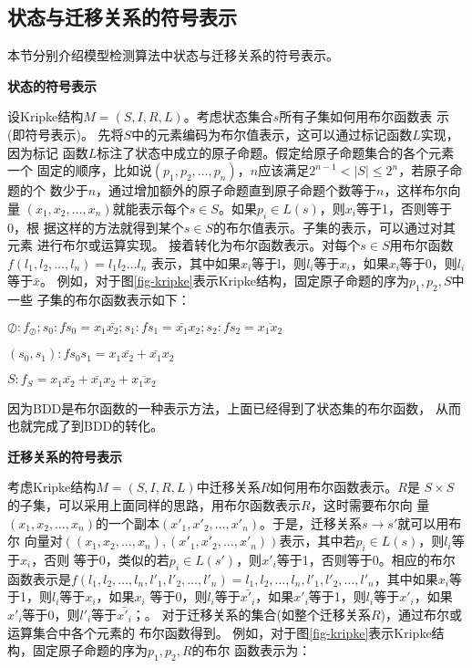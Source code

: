 \subsection{状态与迁移关系的符号表示}
本节分别介绍模型检测算法中状态与迁移关系的符号表示。

\textbf{状态的符号表示}

设Kripke结构$M=(S,I,R,L)$。考虑状态集合$s$所有子集如何用布尔函数表
示(即符号表示)。
先将$S$中的元素编码为布尔值表示，这可以通过标记函数$L$实现，因为标记
函数$L$标注了状态中成立的原子命题。假定给原子命题集合的各个元素一个
固定的顺序，比如说$(p_1,p_2,\ldots,p_n)$，$n$应该满足$2^{n-1}<|S|\leq 2^n$，若原子命题的个
数少于$n$，通过增加额外的原子命题直到原子命题个数等于$n$，这样布尔向量
$(x_1,x_2,\ldots,x_n)$就能表示每个$s\in S$。如果$p_i \in L(s)$，则$x_i$等于1，否则等于0，根
据这样的方法就得到某个$s\in S$的布尔值表示。子集的表示，可以通过对其元素
进行布尔或运算实现。
接着转化为布尔函数表示。对每个$s\in S$用布尔函数$f(l_1,l_2,\ldots,l_n)=l_1l_2\ldots l_n$
表示，其中如果$x_i$等于l，则$l_i$等于$x_i$，如果$x_i$等于0，则$l_i$等于$\bar{x}$。
例如，对于图\ref{fig-kripke}表示Kripke结构，固定原子命题的序为$p_1,p_2,S$中一些
子集的布尔函数表示如下：

$\oslash:f_\oslash;{s_0}:fs_0=x_1\bar{x_2};{s_1}:fs_1=\bar{x_1}x_2;{s_2}:fs_2=\overline{x_1x_2}$

$(s_0,s_1):fs_0s_1=x_1\bar{x_2}+\bar{x_1}x_2$

$S:f_S=x_1\bar{x_2}+\bar{x_1}x_2+\overline{x_1x_2}$

因为BDD是布尔函数的一种表示方法，上面已经得到了状态集的布尔函数，
从而也就完成了到BDD的转化。

\textbf{迁移关系的符号表示}

考虑Kripke结构$M=(S,I,R,L)$中迁移关系$R$如何用布尔函数表示。$R$是
$S\times S$的子集，可以采用上面同样的思路，用布尔函数表示$R$，这时需要布尔向
量$(x_1,x_2,\ldots,x_n)$的一个副本$(x'_1,x'_2,\ldots,x'_n)$。于是，迁移关系$s\to s'$就可以用布尔
向量对$((x_1,x_2,\ldots,x_n),(x'_1,x'_2,\ldots,x'_n))$表示，其中若$p_i\in L(s)$，则$l_i$等于$x_i$，否则
等于0，类似的若$p_i\in L(s')$，则$x'_i$等于1，否则等于0。相应的布尔函数表示是$f(l_1,l_2,\ldots,l_n,l'_1,l'_2,\ldots,l'_n)=l_1,l_2,\ldots,l_n,l'_1,l'_2,\ldots,l'_n$，其中如果$x_i$等于1，则$l_i$等于$x_i$，如果$x_i$
等于0，则$l_i$等于$\bar{x'_i}$，如果$x'_i$等于1，则$l_i$等于$x'_i$，如果$x'_i$等于0，则$l'_i$等于$\bar{x'_i}$；。
对于迁移关系的集合(如整个迁移关系$R$)，通过布尔或运算集合中各个元素的
布尔函数得到。
例如，对于图\ref{fig-kripke}表示Kripke结构，固定原子命题的序为$p_1,p_2,R$的布尔
函数表示为：

